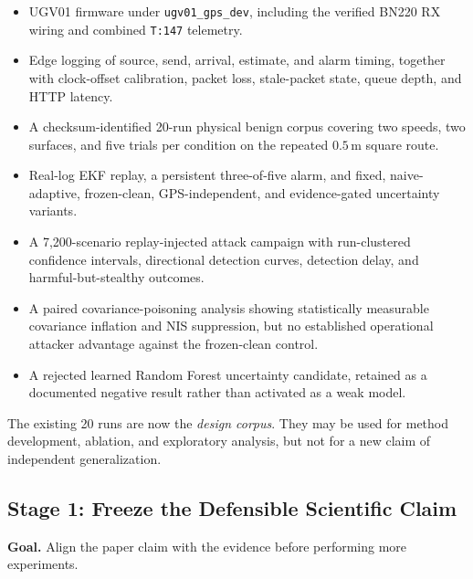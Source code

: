 \documentclass[11pt,a4paper]{article}
\begin{document}
\begin{itemize}
    \item UGV01 firmware under \texttt{ugv01\_gps\_dev}, including the verified
    BN220 RX wiring and combined \texttt{T:147} telemetry.

    \item Edge logging of source, send, arrival, estimate, and alarm timing,
    together with clock-offset calibration, packet loss, stale-packet state,
    queue depth, and HTTP latency.

    \item A checksum-identified 20-run physical benign corpus covering two
    speeds, two surfaces, and five trials per condition on the repeated
    $0.5\,\mathrm{m}$ square route.

    \item Real-log EKF replay, a persistent three-of-five alarm, and fixed,
    naive-adaptive, frozen-clean, GPS-independent, and evidence-gated
    uncertainty variants.

    \item A 7,200-scenario replay-injected attack campaign with run-clustered
    confidence intervals, directional detection curves, detection delay, and
    harmful-but-stealthy outcomes.

    \item A paired covariance-poisoning analysis showing statistically
    measurable covariance inflation and NIS suppression, but no established
    operational attacker advantage against the frozen-clean control.

    \item A rejected learned Random Forest uncertainty candidate, retained as
    a documented negative result rather than activated as a weak model.
\end{itemize}

The existing 20 runs are now the \emph{design corpus}. They may be used for
method development, ablation, and exploratory analysis, but not for a new claim
of independent generalization.

\subsection{Stage 1: Freeze the Defensible Scientific Claim}

\textbf{Goal.} Align the paper claim with the evidence before performing more
experiments.
\end{document}
